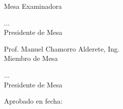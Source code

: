 

\vspace*{1\baselineskip}
%


\vspace*{1\baselineskip}
\hspace{.1\textwidth} %
\begin{minipage}{.8\textwidth}
		
\end{minipage}

\vspace*{1\baselineskip}
\begin{center}
	Mesa Examinadora\\
	
	\vspace*{1\baselineskip}
	\makebox[3in]{\hrulefill}
	\par\noindent
	...\\
	Presidente de Mesa\\
	\vspace*{1\baselineskip}
	\makebox[3in]{\hrulefill}
	\par\noindent
	Prof. Manuel Chamorro Alderete, Ing.\\	
	Miembro de Mesa\\
	\vspace*{1\baselineskip}
	\makebox[3in]{\hrulefill}
	\par\noindent
	...\\
	Presidente de Mesa\\
\end{center}
\vspace*{1\baselineskip}
Aprobado en fecha:



